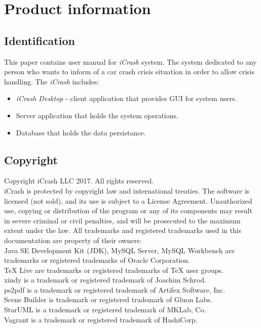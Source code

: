 \chapter{Product information}
\vspace{-6em}


\section{Identification}
This paper contains user manual for \emph{iCrash} system. The system
dedicated to any person who wants to inform of a car crash crisis situation in
order to allow crisis handling. The \emph{iCrash} includes:
\begin{itemize}
  \item  \emph{iCrash Desktop} - client application that provides GUI for system
  users.
  \item Server application that holds the system operations.
  \item Database that holds the data persistance.
\end{itemize}

\section{Copyright}

Copyright iCrash LLC 2017. All rights reserved.\\
iCrash is protected by copyright law and international treaties. The software is
licensed (not sold), and its use is subject to a License Agreement. Unauthorized
use, copying or distribution of the program or any of its components may result in severe criminal or civil penalties, and will be prosecuted to the maximum extent under the law.
All trademarks and registered trademarks used in this documentation are property
of their owners:\\
Java SE Development Kit (JDK), MySQL Server, MySQL Workbench are trademarks or
registered trademarks of Oracle Corporation.\\
TeX Live are trademarks or registered trademarks of TeX user groups.\\
xindy is a trademark or registered trademark of Joachim Schrod. \\
ps2pdf  is a trademark or registered trademark of Artifex Software, Inc.\\
Scene Builder is trademark or registered trademark of Gluon Labs.\\
StarUML is a trademark or registered trademark of MKLab, Co.\\
Vagrant is a trademark or registered trademark of HashiCorp.\\


